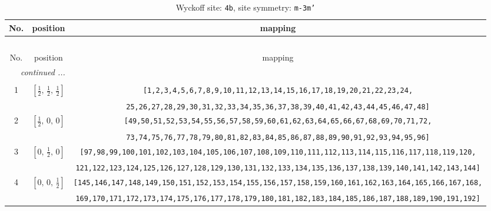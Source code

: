 \documentclass[fleqn,8pt]{jsarticle}
\begin{document}
\begin{longtable}{ccc}
\caption{Wyckoff site: {\tt 4b}, site symmetry: {\tt m-3m'}}
 \\
 \hline \hline
No. & position & mapping \\ \hline \endfirsthead

\multicolumn{2}{l}{\tablename\ \thetable{}} \\
 \hline \hline
No. & position & mapping \\ \hline \endhead

 \hline \hline
\multicolumn{2}{r}{\footnotesize\it continued ...} \\ \endfoot

 \hline \hline
\multicolumn{2}{r}{} \\ \endlastfoot

1 & $\left[ \frac{1}{2},\, \frac{1}{2},\, \frac{1}{2} \right]$ & {\tt [1,2,3,4,5,6,7,8,9,10,11,12,13,14,15,16,17,18,19,20,21,22,23,24,} \\ \hline
 &  & {\tt 25,26,27,28,29,30,31,32,33,34,35,36,37,38,39,40,41,42,43,44,45,46,47,48]} \\ \hline
2 & $\left[ \frac{1}{2},\, 0,\, 0 \right]$ & {\tt [49,50,51,52,53,54,55,56,57,58,59,60,61,62,63,64,65,66,67,68,69,70,71,72,} \\ \hline
 &  & {\tt 73,74,75,76,77,78,79,80,81,82,83,84,85,86,87,88,89,90,91,92,93,94,95,96]} \\ \hline
3 & $\left[ 0,\, \frac{1}{2},\, 0 \right]$ & {\tt [97,98,99,100,101,102,103,104,105,106,107,108,109,110,111,112,113,114,115,116,117,118,119,120,} \\ \hline
 &  & {\tt 121,122,123,124,125,126,127,128,129,130,131,132,133,134,135,136,137,138,139,140,141,142,143,144]} \\ \hline
4 & $\left[ 0,\, 0,\, \frac{1}{2} \right]$ & {\tt [145,146,147,148,149,150,151,152,153,154,155,156,157,158,159,160,161,162,163,164,165,166,167,168,} \\ \hline
 &  & {\tt 169,170,171,172,173,174,175,176,177,178,179,180,181,182,183,184,185,186,187,188,189,190,191,192]} \\
\end{longtable}
\renewcommand{\arraystretch}{1.2}
\end{document}
